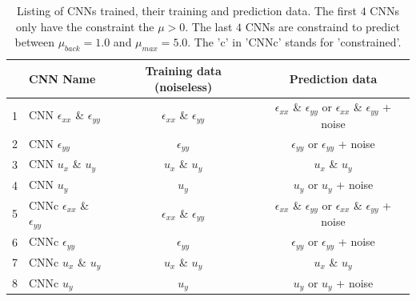 \documentclass[12pt]{article}
\begin{document}
\begin{table}
  \centering
  \begin{tabular}{|l|l|c|c|}
    \hline
     & CNN Name & Training data (noiseless) & Prediction data \\
    \hline
    1 & CNN $\epsilon_{xx}$ \& $\epsilon_{yy}$ & $\epsilon_{xx}$ \& $\epsilon_{yy}$ & $\epsilon_{xx}$ \& $\epsilon_{yy}$ or $\epsilon_{xx}$ \& $\epsilon_{yy}$ + noise\\
    \hline
    2 & CNN $\epsilon_{yy}$ & $\epsilon_{yy}$ & $\epsilon_{yy}$ or $\epsilon_{yy}$ + noise\\
    \hline
    3 & CNN $u_x$ \& $u_y$ & $u_x$ \& $u_y$ & $u_x$ \& $u_y$\\
    \hline
    4 & CNN $u_y$ & $u_y$ & $u_y$ or $u_y$ + noise\\
    \hline
    5 & CNNc $\epsilon_{xx}$ \& $\epsilon_{yy}$ & $\epsilon_{xx}$ \& $\epsilon_{yy}$ & $\epsilon_{xx}$ \& $\epsilon_{yy}$ or $\epsilon_{xx}$ \& $\epsilon_{yy}$ + noise\\
    \hline
    6 & CNNc $\epsilon_{yy}$ & $\epsilon_{yy}$ & $\epsilon_{yy}$ or $\epsilon_{yy}$ + noise\\
    \hline
    7 & CNNc $u_x$ \& $u_y$ & $u_x$ \& $u_y$ & $u_x$ \& $u_y$\\
    \hline
    8 & CNNc $u_y$ & $u_y$ & $u_y$ or $u_y$ + noise\\
    \hline
  \end{tabular}
  \caption{\label{tab:cnnone:io} Listing of CNNs trained, their training and prediction data. The first $4$ CNNs only have the constraint the $\mu>0$. The last $4$ CNNs are constraind to predict between $\mu_{back}=1.0$ and $\mu_{max}=5.0$. The 'c' in 'CNNc' stands for 'constrained'.}
\end{table}
%
\end{document}
